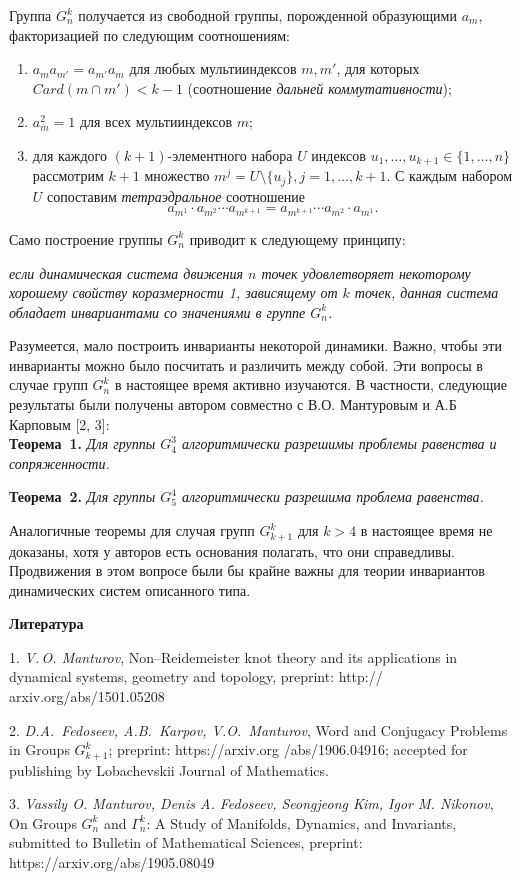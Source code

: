 Группа $G_n^k$ получается из свободной группы, порожденной образующими $a_m$, факторизацией по следующим соотношениям:

\begin{enumerate}
	\item $a_{m}a_{m'}=a_{m'}a_{m}$ для любых мультииндексов $m, m'$, для которых $Card(m\cap m') < k-1$ (соотношение {\em дальней коммутативности});
	\item $a_m^2=1$ для всех мультииндексов $m$;
	\item для каждого $(k+1)$-элементного набора $U$ индексов $u_{1},\dots, u_{k+1} \in \{1,\dots, n\}$ рассмотрим $k+1$ множество $m^{j}=U\setminus \{u_{j}\}, j=1,\dots, k+1$. С каждым набором $U$ сопоставим {\em тетраэдральное} соотношение $$a_{m^1}\cdot a_{m^2}\cdots a_{m^{k+1}}= a_{m^{k+1}}\cdots a_{m^2}\cdot a_{m^1}.$$
\end{enumerate}

Само построение группы $G_n^k$ приводит к следующему принципу:

\begin{center}
	{\em если динамическая система движения $n$ точек удовлетворяет некоторому хорошему свойству коразмерности 1, зависящему от $k$ точек, данная система обладает инвариантами со значениями в группе $G_n^k$.}
\end{center}

Разумеется, мало построить инварианты некоторой динамики. Важно, чтобы эти инварианты можно было посчитать и различить между собой. Эти вопросы в случае групп $G_n^k$ в настоящее время активно изучаются. В частности, следующие результаты были получены автором совместно с В.О. Мантуровым и А.Б Карповым [2, 3]: \\

\textbf{Теорема~1.} {\it Для группы $G_4^3$ алгоритмически разрешимы проблемы равенства и сопряженности.}

\textbf{Теорема~2.} {\it Для группы $G_5^4$ алгоритмически разрешима проблема равенства.}

Аналогичные теоремы для случая групп $G_{k+1}^k$ для $k>4$ в настоящее время не доказаны, хотя у авторов есть основания полагать, что они справедливы. Продвижения в этом вопросе были бы крайне важны для теории инвариантов динамических систем описанного типа. 


\smallskip \centerline {\bf Литература} \nopagebreak


1. {\it V.\,O. Manturov}, Non--Reidemeister knot theory and its applications in dynamical systems, geometry and topology, preprint: http:// arxiv.org/abs/1501.05208

2. {\it D.A.~Fedoseev, A.B.~Karpov, V.O.~Manturov}, Word and Conjugacy Problems in Groups $G_{k+1}^{k}$; preprint: https://arxiv.org /abs/1906.04916; accepted for publishing by Lobachevskii Journal of Mathematics.

3. {\it Vassily O. Manturov, Denis A. Fedoseev, Seongjeong Kim, Igor M. Nikonov}, On Groups $G^k_n$ and $\Gamma^k_n$: A Study of Manifolds, Dynamics, and Invariants, submitted to Bulletin of Mathematical Sciences, preprint: https://arxiv.org/abs/1905.08049

